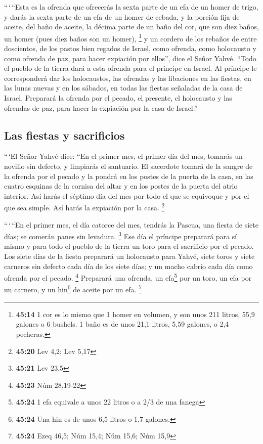  ``\,`\,``Esta es la ofrenda que ofrecerás la sexta parte
de un efa de un homer de trigo, y darás la sexta parte de un efa de un
homer de cebada,  y la porción fija de aceite, del baño
de aceite, la décima parte de un baño del cor, que son diez baños, un
homer (pues diez baños son un homer), \footnote{\textbf{45:14} 1 cor es
  lo mismo que 1 homer en volumen, y son unos 211 litros, 55,9 galones o
  6 bushels. 1 baño es de unos 21,1 litros, 5,59 galones, o 2,4
  pecheras.}  y un cordero de los rebaños de entre
doscientos, de los pastos bien regados de Israel, como ofrenda, como
holocausto y como ofrenda de paz, para hacer expiación por ellos'', dice
el Señor Yahvé.  ``Todo el pueblo de la tierra dará a
esta ofrenda para el príncipe en Israel.  Al príncipe le
corresponderá dar los holocaustos, las ofrendas y las libaciones en las
fiestas, en las lunas nuevas y en los sábados, en todas las fiestas
señaladas de la casa de Israel. Preparará la ofrenda por el pecado, el
presente, el holocausto y las ofrendas de paz, para hacer la expiación
por la casa de Israel.''

\hypertarget{las-fiestas-y-sacrificios}{%
\subsection{Las fiestas y sacrificios}\label{las-fiestas-y-sacrificios}}

 ``\,`El Señor Yahvé dice: ``En el primer mes, el primer
día del mes, tomarás un novillo sin defecto, y limpiarás el santuario.
 El sacerdote tomará de la sangre de la ofrenda por el
pecado y la pondrá en los postes de la puerta de la casa, en las cuatro
esquinas de la cornisa del altar y en los postes de la puerta del atrio
interior.  Así harás el séptimo día del mes por todo el
que se equivoque y por el que sea simple. Así harás la expiación por la
casa. \footnote{\textbf{45:20} Lev 4,2; Lev 5,17}

 ``\,`\,``En el primer mes, el día catorce del mes,
tendrás la Pascua, una fiesta de siete días; se comerán panes sin
levadura. \footnote{\textbf{45:21} Lev 23,5}  Ese día el
príncipe preparará para sí mismo y para todo el pueblo de la tierra un
toro para el sacrificio por el pecado.  Los siete días de
la fiesta preparará un holocausto para Yahvé, siete toros y siete
carneros sin defecto cada día de los siete días; y un macho cabrío cada
día como ofrenda por el pecado. \footnote{\textbf{45:23} Núm 28,19-22}
 Preparará una ofrenda, un efa\footnote{\textbf{45:24} 1
  efa equivale a unos 22 litros o a 2/3 de una fanega} por un toro, un
efa por un carnero, y un hin\footnote{\textbf{45:24} Una hin es de unos
  6,5 litros o 1,7 galones.} de aceite por un efa. \footnote{\textbf{45:24}
  Ezeq 46,5; Núm 15,4; Núm 15,6; Núm 15,9}

